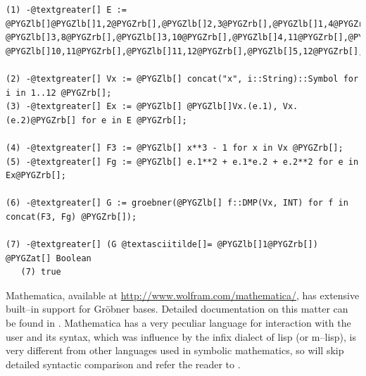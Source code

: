 \begin{Verbatim}[commandchars=@\[\]]
(1) -@textgreater[] E := @PYGZlb[]@PYGZlb[]1,2@PYGZrb[],@PYGZlb[]2,3@PYGZrb[],@PYGZlb[]1,4@PYGZrb[],@PYGZlb[]1,6@PYGZrb[],@PYGZlb[]1,12@PYGZrb[],@PYGZlb[]2,5@PYGZrb[],@PYGZlb[]2,7@PYGZrb[],
@PYGZlb[]3,8@PYGZrb[],@PYGZlb[]3,10@PYGZrb[],@PYGZlb[]4,11@PYGZrb[],@PYGZlb[]4,9@PYGZrb[],@PYGZlb[]5,6@PYGZrb[],@PYGZlb[]6,7@PYGZrb[],@PYGZlb[]7,8@PYGZrb[],@PYGZlb[]8,9@PYGZrb[],@PYGZlb[]9,10@PYGZrb[],
@PYGZlb[]10,11@PYGZrb[],@PYGZlb[]11,12@PYGZrb[],@PYGZlb[]5,12@PYGZrb[],@PYGZlb[]5,9@PYGZrb[],@PYGZlb[]6,10@PYGZrb[],@PYGZlb[]7,11@PYGZrb[],@PYGZlb[]8,12@PYGZrb[]@PYGZrb[];

(2) -@textgreater[] Vx := @PYGZlb[] concat("x", i::String)::Symbol for i in 1..12 @PYGZrb[];
(3) -@textgreater[] Ex := @PYGZlb[] @PYGZlb[]Vx.(e.1), Vx.(e.2)@PYGZrb[] for e in E @PYGZrb[];

(4) -@textgreater[] F3 := @PYGZlb[] x**3 - 1 for x in Vx @PYGZrb[];
(5) -@textgreater[] Fg := @PYGZlb[] e.1**2 + e.1*e.2 + e.2**2 for e in Ex@PYGZrb[];

(6) -@textgreater[] G := groebner(@PYGZlb[] f::DMP(Vx, INT) for f in concat(F3, Fg) @PYGZrb[]);

(7) -@textgreater[] (G @textasciitilde[]= @PYGZlb[]1@PYGZrb[]) @PYGZat[] Boolean
   (7) true
\end{Verbatim}
\noindent
Mathematica, available at \href{http://www.wolfram.com/mathematica/}{http://www.wolfram.com/mathematica/}, has extensive built--in support
for Gröbner bases. Detailed documentation on this matter can be found in \cite{MathematicaGroebner}.
Mathematica has a very peculiar language for interaction with the user and its syntax, which was
influence by the infix dialect of lisp (or m--lisp), is very different from other languages used
in symbolic mathematics, so will skip detailed syntactic comparison and refer the reader to
\cite{Wolfram2003book}.

